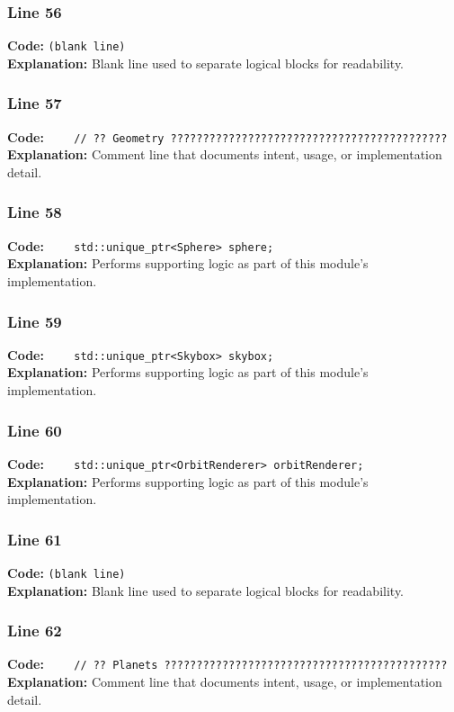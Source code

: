 \documentclass[11pt,a4paper]{article}
\begin{document}
\subsubsection*{Line 56}
\textbf{Code:} \texttt{(blank line)}\\
\textbf{Explanation:} Blank line used to separate logical blocks for readability.

\subsubsection*{Line 57}
\textbf{Code:} \verb|    // ?? Geometry ???????????????????????????????????????????|\\
\textbf{Explanation:} Comment line that documents intent, usage, or implementation detail.

\subsubsection*{Line 58}
\textbf{Code:} \verb|    std::unique_ptr<Sphere> sphere;|\\
\textbf{Explanation:} Performs supporting logic as part of this module's implementation.

\subsubsection*{Line 59}
\textbf{Code:} \verb|    std::unique_ptr<Skybox> skybox;|\\
\textbf{Explanation:} Performs supporting logic as part of this module's implementation.

\subsubsection*{Line 60}
\textbf{Code:} \verb|    std::unique_ptr<OrbitRenderer> orbitRenderer;|\\
\textbf{Explanation:} Performs supporting logic as part of this module's implementation.

\subsubsection*{Line 61}
\textbf{Code:} \texttt{(blank line)}\\
\textbf{Explanation:} Blank line used to separate logical blocks for readability.

\subsubsection*{Line 62}
\textbf{Code:} \verb|    // ?? Planets ????????????????????????????????????????????|\\
\textbf{Explanation:} Comment line that documents intent, usage, or implementation detail.
\end{document}
